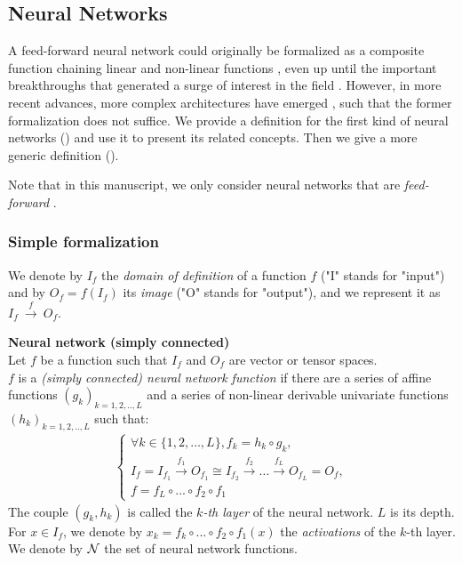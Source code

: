 \subsection{Neural Networks}

A feed-forward neural network could originally be formalized as a composite function chaining linear and non-linear functions \citep{rumelhart1985learning,lecun1989backpropagation,lecun1995convolutional}, even up until the important breakthroughs that generated a surge of interest in the field \citep{hinton2012deep,krizhevsky2012imagenet,simonyan2014very}. However, in more recent advances, more complex architectures have emerged \citep{szegedy2015going,he2016deep,zoph2016neural,huang2017densely}, such that the former formalization does not suffice. We provide a definition for the first kind of neural networks () and use it to present its related concepts. Then we give a more generic definition ().

Note that in this manuscript, we only consider neural networks that are \emph{feed-forward} \citep{zell1994simulation, wiki:fnn}.

\subsubsection{Simple formalization}

We denote by $I_f$ the \textit{domain of definition} of a function $f$ ("I" stands for "input") and by $O_f = f(I_f)$ its \textit{image} ("O" stands for "output"), and we represent it as $I_f~\xrightarrow{f}~O_f$.

\begin{definition}\textbf{Neural network (simply connected)}\\
Let $f$ be a function such that $I_f$ and $O_f$ are vector or tensor spaces.\\
$f$ is a \emph{(simply connected) neural network function} if there are a series of affine functions $(g_k)_{k=1,2,..,L}$ and a series of non-linear derivable univariate functions $(h_k)_{k=1,2,..,L}$ such that:
\begin{gather*}
\left\{
  \begin{array}{l}
    \forall k \in \{1, 2, \ldots, L\}, f_k = h_k \circ g_k, \\
    I_f = I_{f_1} \xrightarrow{f_1} O_{f_1} \cong I_{f_2} \xrightarrow{f_2} \dots \xrightarrow{f_L} O_{f_L} = O_f, \\
    f = f_{L} \circ ... \circ f_{2} \circ f_1
  \end{array}
\right.
\end{gather*}
The couple $(g_k, h_k)$ is called the \emph{$k$-th layer} of the neural network. $L$ is its depth.
For $x \in I_f$, we denote by $x_k = f_k \circ ... \circ f_{2} \circ f_1 (x)$ the \emph{activations} of the $k$-th layer. We denote by $\mathcal{N}$ the set of neural network functions.
\label{def:nn}
\end{definition}

